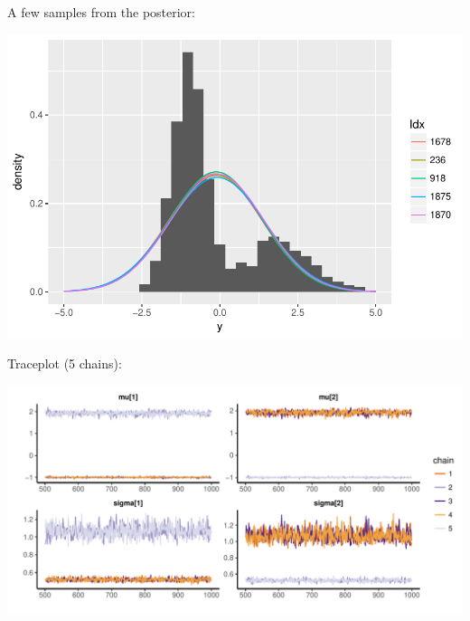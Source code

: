 \begin{frame}
\begin{analysis}[K=1]

\smallskip

A few samples from the posterior:

\smallskip

\begin{center}
\includegraphics[width=0.70\linewidth]{../LectureAssets/L07/fm_fit01}
\end{center}

\bigskip

\end{analysis}
\end{frame}

\begin{frame}
\begin{analysis}[K=2]

\smallskip

Traceplot (5 chains):

\smallskip

\begin{center}
\includegraphics[width=0.90\linewidth]{../LectureAssets/L07/fm_traceplot02}
\end{center}

\smallskip

\end{analysis}
\end{frame}


